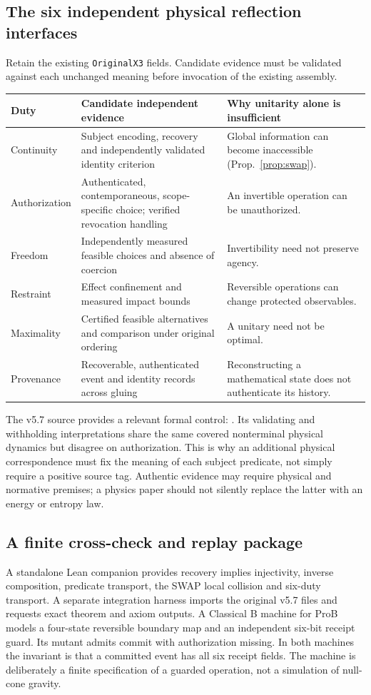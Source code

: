 \documentclass[11pt,a4paper]{article}
\begin{document}
\subsection{The six independent physical reflection interfaces}
Retain the existing \texttt{OriginalX3} fields. Candidate evidence must be validated against each unchanged meaning before invocation of the existing assembly.
\begin{center}\small
\begin{tabularx}{\linewidth}{@{}p{27mm}XX@{}}\toprule
Duty & Candidate independent evidence & Why unitarity alone is insufficient\\\midrule
Continuity & Subject encoding, recovery and independently validated identity criterion & Global information can become inaccessible (Prop.~\ref{prop:swap}).\\
Authorization & Authenticated, contemporaneous, scope-specific choice; verified revocation handling & An invertible operation can be unauthorized.\\
Freedom & Independently measured feasible choices and absence of coercion & Invertibility need not preserve agency.\\
Restraint & Effect confinement and measured impact bounds & Reversible operations can change protected observables.\\
Maximality & Certified feasible alternatives and comparison under original ordering & A unitary need not be optimal.\\
Provenance & Recoverable, authenticated event and identity records across gluing & Reconstructing a mathematical state does not authenticate its history.\\\bottomrule\end{tabularx}\end{center}
The v5.7 source  provides a relevant formal control: . Its validating and withholding interpretations share the same covered nonterminal physical dynamics but disagree on authorization. This is why an additional physical correspondence must fix the meaning of each subject predicate, not simply require a positive source tag. Authentic evidence may require physical and normative premises; a physics paper should not silently replace the latter with an energy or entropy law.

\subsection{A finite cross-check and replay package}
A standalone Lean companion provides recovery implies injectivity, inverse composition, predicate transport, the SWAP local collision and six-duty transport. A separate integration harness imports the original v5.7 files and requests exact theorem and axiom outputs. A Classical B machine for ProB models a four-state reversible boundary map and an independent six-bit receipt guard. Its mutant admits commit with authorization missing. In both machines the invariant is that a committed event has all six receipt fields. The machine is deliberately a finite specification of a guarded operation, not a simulation of null-cone gravity.
\end{document}
